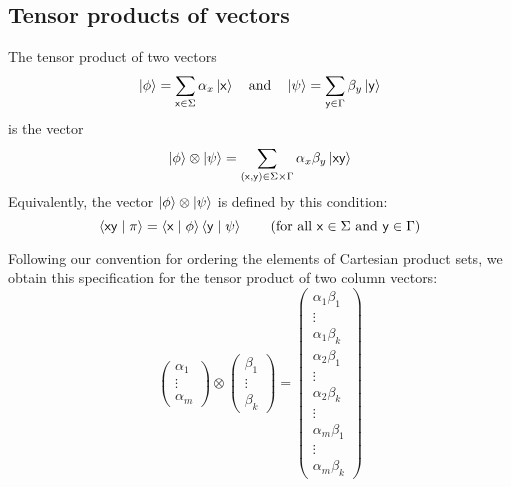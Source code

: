 \documentclass{report}
\begin{document}
\subsection{Tensor products of vectors}
The tensor product of two vectors
\begin{equation*}
    \ket{\phi}=\sum\limits_{\mathsf{x}\in\Sigma}\alpha_x\ket{\mathsf{x}} \quad \text{and} \quad \ket{\psi}=\sum\limits_{\mathsf{y}\in\Gamma}\beta_y\ket{\mathsf{y}}
\end{equation*}
is the vector
\begin{equation*}
    \ket{\phi}\otimes\ket{\psi}=\sum\limits_{(\mathsf{x},\mathsf{y})\in\Sigma\times\Gamma}\alpha_x\beta_y\ket{\mathsf{xy}}
\end{equation*}
Equivalently, the vector $\ket{\phi}\otimes\ket{\psi}$ is defined by this condition:
\begin{equation*}
    \braket{\mathsf{xy}\mid\pi}=\braket{\mathsf{x}\mid\phi}\braket{\mathsf{y}\mid\psi} \qquad \text{(for all } \mathsf{x}\in\Sigma \text{ and } \mathsf{y}\in\Gamma \text{)}
\end{equation*}


Following our convention for ordering the elements of Cartesian product sets, we obtain this specification for the tensor product of two column vectors:
\begin{equation*}
    \begin{pmatrix}
        \alpha_1 \\
        \vdots \\
        \alpha_m
    \end{pmatrix}
    \otimes
    \begin{pmatrix}
        \beta_1 \\
        \vdots \\
        \beta_k
    \end{pmatrix}
    =
    \begin{pmatrix}
        \alpha_1\beta_1 \\
        \vdots \\
        \alpha_1\beta_k \\
        \alpha_2\beta_1 \\
        \vdots \\
        \alpha_2\beta_k \\
        \vdots \\
        \alpha_m\beta_1 \\
        \vdots \\
        \alpha_m\beta_k
    \end{pmatrix}
\end{equation*}
\end{document}
